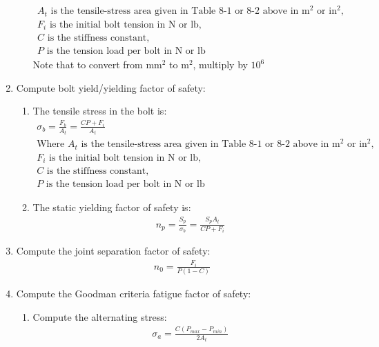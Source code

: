 \documentclass[11pt, fleqn]{article}
\begin{document}
\begin{enumerate}
\begin{enumerate}
\begin{align*}
            \text{$A_t$ is the tensile-stress area given in Table 8-1 or 8-2 above in $\mathrm{m^2}$ or $\mathrm{in^2}$,}\\
            \text{$F_i$ is the initial bolt tension in N or lb,}\\
            \text{$C$ is the stiffness constant,}\\
            \text{$P$ is the tension load per bolt in N or lb}
            \end{align*}
            Note that to convert from $\mathrm{mm^2}$ to $\mathrm{m^2}$, multiply by $10^6$
        \end{enumerate}
         \item Compute bolt yield/yielding factor of safety:
        \begin{enumerate}
            \item The tensile stress in the bolt is:
            \begin{align*}
                \sigma_b = \frac{F_b}{A_t}= \frac{CP+F_i}{A_t}\\
                \text{Where $A_t$ is the tensile-stress area given in Table 8-1 or 8-2 above in $\mathrm{m^2}$ or $\mathrm{in^2}$,}\\
                \text{$F_i$ is the initial bolt tension in N or lb,}\\
                \text{$C$ is the stiffness constant,}\\
                \text{$P$ is the tension load per bolt in N or lb}
            \end{align*}
            \item The static yielding factor of safety is:
            \begin{align*}
                n_p = \frac{S_p}{\sigma_b} = \frac{S_pA_t}{CP+F_i}
            \end{align*}
        \end{enumerate}
        \item Compute the joint separation factor of safety:
        \begin{align*}
            n_0 = \frac{F_i}{P(1-C)}
        \end{align*}
        \item Compute the Goodman criteria fatigue factor of safety:
        \begin{enumerate}
            \item Compute the alternating stress:
            \begin{align*}
                \sigma_a = \frac{C(P_{max}-P_{min})}{2A_t}

\end{align*}
\end{enumerate}
\end{enumerate}
\end{document}
